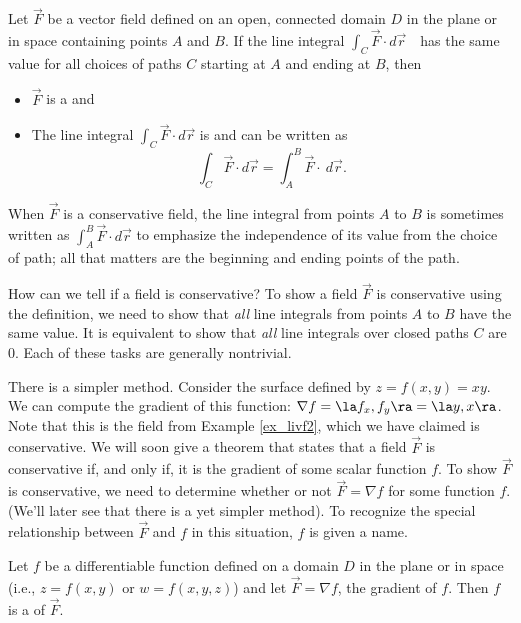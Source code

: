 {Let $\vec F$ be a vector field defined on an open, connected domain $D$ in the plane or in space  containing points $A$ and $B$. If the line integral
$\int_C \vec F\cdot d\vec r$\ \ has the same value for all choices of paths $C$ starting at $A$ and ending at $B$, then
\begin{itemize}
	\item $\vec F$ is a  and
	\item	The line integral $\int_C \vec F\cdot d\vec r$ is  and can be written as 
	\[
	\int_C \vec F\cdot d\vec r = \int_A^B \vec F\cdot \ d\vec r.
	\] 
\end{itemize}
}

When $\vec F$ is a conservative field, the line integral from points $A$ to $B$ is sometimes written as $\int_A^B\vec F\cdot d\vec r$ to emphasize the independence of its value from the choice of path; all that matters are the beginning and ending points of the path.

How can we tell if a field is conservative? To show a field $\vec F$ is conservative using the definition, we need to show that \emph{all} line integrals from points $A$ to $B$ have the same value. It is equivalent to show that \emph{all} line integrals over closed paths $C$ are 0. Each of these tasks are generally nontrivial.

There is a simpler method. Consider the surface defined by $z = f(x,y) = xy$. We can compute the gradient of this function: $\nabla f = \la f_x, f_y\ra = \la y, x\ra$. Note that this is the field from Example \ref{ex_livf2}, which we have claimed is conservative. We will soon give a theorem that states that a field $\vec F$ is conservative if, and only if, it is the gradient of some scalar function $f$. To show $\vec F$ is conservative, we need to determine whether or not $\vec F = \nabla f$ for some function $f$. (We'll later see that there is a yet simpler method). To recognize the special relationship between $\vec F$ and $f$ in this situation, $f$ is given a name.

{Let $f$ be a differentiable function defined on a  domain $D$ in the plane or in space (i.e., $z = f(x,y)$ or $w = f(x,y,z)$) and let $\vec F = \nabla f$, the gradient of $f$. Then $f$ is a  of $\vec F$.
}

